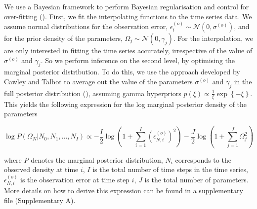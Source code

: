 \documentclass[11pt, oneside]{article}
\begin{document}
We use a Bayesian framework to perform Bayesian regularisation and control for over-fitting (\cite{Cawley2007}).
First, we fit the interpolating functions to the time series data.
We assume normal distributions for the observation error, $\epsilon^{(o)}_i \sim \mathcal{N}(0,\sigma^{(o)})$, and for the prior density of the parameters, $\Omega_j \sim \mathcal{N}(0,\gamma_j)$.
For the interpolation, we are only interested in fitting the time series accurately, irrespective of the value of $\sigma^{(o)}$ and $\gamma_j$.
So we perform inference on the second level, by optimising the marginal posterior distribution.
To do this, we use the approach developed by Cawley and Talbot to average out the value of the parameters $\sigma^{(o)}$ and $\gamma_j$ in the full posterior distribution (\cite{Cawley2007}), assuming gamma hyperpriors $p(\xi) \propto \frac{1}{\xi} \exp\left\{- \xi \right\}$.
This yields the following expression for the log marginal posterior density of the parameters 


\vspace{-0.5cm}
\begin{equation}
    \log P(\Omega_N | N_0, N_1, ..., N_I) \propto - \frac{I}{2} \log \left(1 + \sum_{i=1}^{I} \left( \epsilon^{(o)}_{N,i} \right)^2 \right) - \frac{J}{2} \log \left(1 + \sum_{j=1}^{J} \Omega_{j}^2 \right)
\end{equation}

where $P$ denotes the marginal posterior distribution,
$N_i$ corresponds to the observed density at time $i$, 
$I$ is the total number of time steps in the time series, 
$\epsilon^{(o)}_{N,i}$ is the observation error at time step $i$, 
$J$ is the total number of parameters. 
More details on how to derive this expression can be found in a supplementary file (Supplementary A).

\end{document}
